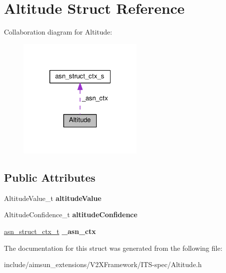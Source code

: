 \hypertarget{structAltitude}{}\section{Altitude Struct Reference}
\label{structAltitude}


Collaboration diagram for Altitude\+:\nopagebreak
\begin{figure}[H]
\begin{center}
\leavevmode
\includegraphics[width=172pt]{structAltitude__coll__graph}
\end{center}
\end{figure}
\subsection*{Public Attributes}
\begin{DoxyCompactItemize}
\item 
Altitude\+Value\+\_\+t {\bfseries altitude\+Value}\hypertarget{structAltitude_a1fec09d72cc65cfe51b1331bacc78ad4}{}\label{structAltitude_a1fec09d72cc65cfe51b1331bacc78ad4}

\item 
Altitude\+Confidence\+\_\+t {\bfseries altitude\+Confidence}\hypertarget{structAltitude_adb32cb3dd58733df3d926b5ee36e2c6e}{}\label{structAltitude_adb32cb3dd58733df3d926b5ee36e2c6e}

\item 
\hyperlink{structasn__struct__ctx__s}{asn\+\_\+struct\+\_\+ctx\+\_\+t} {\bfseries \+\_\+asn\+\_\+ctx}\hypertarget{structAltitude_af1f38d068dd9475657ab0f06bbadb781}{}\label{structAltitude_af1f38d068dd9475657ab0f06bbadb781}

\end{DoxyCompactItemize}


The documentation for this struct was generated from the following file\+:\begin{DoxyCompactItemize}
\item 
include/aimsun\+\_\+extensions/\+V2\+X\+Framework/\+I\+T\+S-\/spec/Altitude.\+h\end{DoxyCompactItemize}
